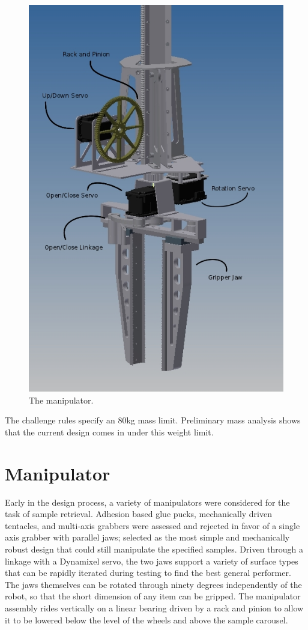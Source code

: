\documentclass[12pt]{article}
\begin{document}
\begin{figure}[htbp]
\centering
\includegraphics[width=4.5in]{../assets/manipulator.jpg}
\caption{The manipulator.}
\label{fig_bot_manipulator}
\end{figure}

The challenge rules specify an 80kg mass limit. Preliminary mass analysis shows that the current design comes in under this weight limit.

%
\section{Manipulator}\label{Manipulator}

Early in the design process, a variety of manipulators were considered for the task of sample retrieval. Adhesion based glue pucks, mechanically driven tentacles, and multi-axis grabbers were assessed and rejected in favor of a single axis grabber with parallel jaws; selected as the most simple and mechanically robust design that could still manipulate the specified samples. Driven through a linkage with a Dynamixel servo, the two jaws support a variety of surface types that can be rapidly iterated during testing to find the best general performer. The jaws themselves can be rotated through ninety degrees independently of the robot, so that the short dimension of any item can be gripped. The manipulator assembly rides vertically on a linear bearing driven by a rack and pinion to allow it to be lowered below the level of the wheels and above the sample carousel.
\end{document}
